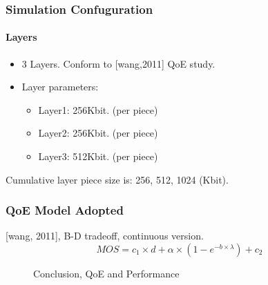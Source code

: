 \documentclass[14pt]{beamer}
\begin{document}
\begin{frame}
\frametitle{Simulation Confuguration}
\framesubtitle{Layers}
\begin{itemize}
	\item 3 Layers. Conform to [wang,2011] QoE study.  
	\item Layer parameters:
		\begin{itemize}
			\item Layer1: 256Kbit. (per piece) 
			\item Layer2: 256Kbit. (per piece) 
			\item Layer3: 512Kbit. (per piece) 
		\end{itemize}
\end{itemize}
Cumulative layer piece size is: 256, 512, 1024 (Kbit). 
\end{frame}

\begin{frame}
\frametitle{QoE Model Adopted}
[wang, 2011], B-D tradeoff, continuous version. 
\begin{equation}
	MOS = c_1 \times d + \alpha \times (1 - e^{-b \times \lambda}) + c_2
\end{equation}
\begin{figure}
	\caption{Conclusion, QoE and Performance}
\end{figure}
\end{frame}
\end{document}

